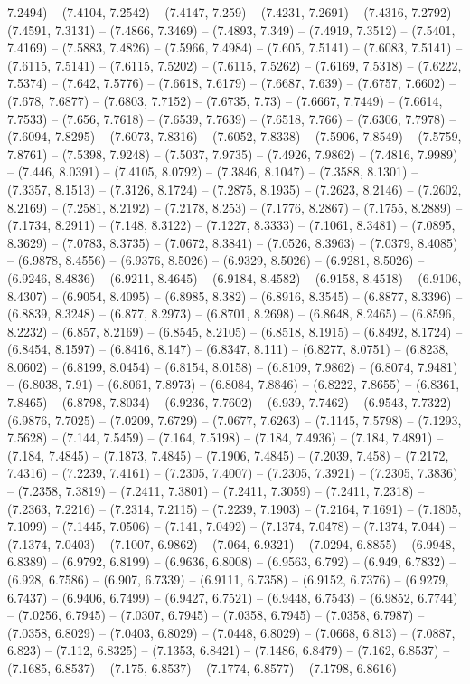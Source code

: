 7.2494) -- (7.4104, 7.2542) -- (7.4147, 7.259) -- (7.4231, 7.2691) -- (7.4316, 7.2792) -- (7.4591, 7.3131) -- (7.4866, 7.3469) -- (7.4893, 7.349) -- (7.4919, 7.3512) -- (7.5401, 7.4169) -- (7.5883, 7.4826) -- (7.5966, 7.4984) -- (7.605, 7.5141) -- (7.6083, 7.5141) -- (7.6115, 7.5141) -- (7.6115, 7.5202) -- (7.6115, 7.5262) -- (7.6169, 7.5318) -- (7.6222, 7.5374) -- (7.642, 7.5776) -- (7.6618, 7.6179) -- (7.6687, 7.639) -- (7.6757, 7.6602) -- (7.678, 7.6877) -- (7.6803, 7.7152) -- (7.6735, 7.73) -- (7.6667, 7.7449) -- (7.6614, 7.7533) -- (7.656, 7.7618) -- (7.6539, 7.7639) -- (7.6518, 7.766) -- (7.6306, 7.7978) -- (7.6094, 7.8295) -- (7.6073, 7.8316) -- (7.6052, 7.8338) -- (7.5906, 7.8549) -- (7.5759, 7.8761) -- (7.5398, 7.9248) -- (7.5037, 7.9735) -- (7.4926, 7.9862) -- (7.4816, 7.9989) -- (7.446, 8.0391) -- (7.4105, 8.0792) -- (7.3846, 8.1047) -- (7.3588, 8.1301) -- (7.3357, 8.1513) -- (7.3126, 8.1724) -- (7.2875, 8.1935) -- (7.2623, 8.2146) -- (7.2602, 8.2169) -- (7.2581, 8.2192) -- (7.2178, 8.253) -- (7.1776, 8.2867) -- (7.1755, 8.2889) -- (7.1734, 8.2911) -- (7.148, 8.3122) -- (7.1227, 8.3333) -- (7.1061, 8.3481) -- (7.0895, 8.3629) -- (7.0783, 8.3735) -- (7.0672, 8.3841) -- (7.0526, 8.3963) -- (7.0379, 8.4085) -- (6.9878, 8.4556) -- (6.9376, 8.5026) -- (6.9329, 8.5026) -- (6.9281, 8.5026) -- (6.9246, 8.4836) -- (6.9211, 8.4645) -- (6.9184, 8.4582) -- (6.9158, 8.4518) -- (6.9106, 8.4307) -- (6.9054, 8.4095) -- (6.8985, 8.382) -- (6.8916, 8.3545) -- (6.8877, 8.3396) -- (6.8839, 8.3248) -- (6.877, 8.2973) -- (6.8701, 8.2698) -- (6.8648, 8.2465) -- (6.8596, 8.2232) -- (6.857, 8.2169) -- (6.8545, 8.2105) -- (6.8518, 8.1915) -- (6.8492, 8.1724) -- (6.8454, 8.1597) -- (6.8416, 8.147) -- (6.8347, 8.111) -- (6.8277, 8.0751) -- (6.8238, 8.0602) -- (6.8199, 8.0454) -- (6.8154, 8.0158) -- (6.8109, 7.9862) -- (6.8074, 7.9481) -- (6.8038, 7.91) -- (6.8061, 7.8973) -- (6.8084, 7.8846) -- (6.8222, 7.8655) -- (6.8361, 7.8465) -- (6.8798, 7.8034) -- (6.9236, 7.7602) -- (6.939, 7.7462) -- (6.9543, 7.7322) -- (6.9876, 7.7025) -- (7.0209, 7.6729) -- (7.0677, 7.6263) -- (7.1145, 7.5798) -- (7.1293, 7.5628) -- (7.144, 7.5459) -- (7.164, 7.5198) -- (7.184, 7.4936) -- (7.184, 7.4891) -- (7.184, 7.4845) -- (7.1873, 7.4845) -- (7.1906, 7.4845) -- (7.2039, 7.458) -- (7.2172, 7.4316) -- (7.2239, 7.4161) -- (7.2305, 7.4007) -- (7.2305, 7.3921) -- (7.2305, 7.3836) -- (7.2358, 7.3819) -- (7.2411, 7.3801) -- (7.2411, 7.3059) -- (7.2411, 7.2318) -- (7.2363, 7.2216) -- (7.2314, 7.2115) -- (7.2239, 7.1903) -- (7.2164, 7.1691) -- (7.1805, 7.1099) -- (7.1445, 7.0506) -- (7.141, 7.0492) -- (7.1374, 7.0478) -- (7.1374, 7.044) -- (7.1374, 7.0403) -- (7.1007, 6.9862) -- (7.064, 6.9321) -- (7.0294, 6.8855) -- (6.9948, 6.8389) -- (6.9792, 6.8199) -- (6.9636, 6.8008) -- (6.9563, 6.792) -- (6.949, 6.7832) -- (6.928, 6.7586) -- (6.907, 6.7339) -- (6.9111, 6.7358) -- (6.9152, 6.7376) -- (6.9279, 6.7437) -- (6.9406, 6.7499) -- (6.9427, 6.7521) -- (6.9448, 6.7543) -- (6.9852, 6.7744) -- (7.0256, 6.7945) -- (7.0307, 6.7945) -- (7.0358, 6.7945) -- (7.0358, 6.7987) -- (7.0358, 6.8029) -- (7.0403, 6.8029) -- (7.0448, 6.8029) -- (7.0668, 6.813) -- (7.0887, 6.823) -- (7.112, 6.8325) -- (7.1353, 6.8421) -- (7.1486, 6.8479) -- (7.162, 6.8537) -- (7.1685, 6.8537) -- (7.175, 6.8537) -- (7.1774, 6.8577) -- (7.1798, 6.8616) -- 